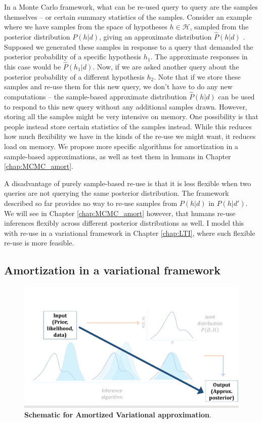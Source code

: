 In a Monte Carlo framework, what can be re-used query to query are the samples themselves -- or certain summary statistics of the samples. Consider an example where we have samples from the space of hypotheses $h \in \mathcal{H}$, sampled from the posterior distribution $P(h | d)$, giving an approximate distribution $\hat{P}(h | d)$ . Supposed we generated these samples in response to a query that demanded the posterior probability of a specific hypothesis $h_1$. The approximate responses in this case would be $\hat{P}(h_1 |d)$. Now, if we are asked another query about the posterior probability of a different hypothesis $h_2$. Note that if we store these samples and re-use them for this new query, we don't have to do any new computations -- the sample-based approximate distribution $\hat{P}(h | d)$ can be used to respond to this new query without any additional samples drawn. However, storing all the samples might be very intensive on memory. One possibility is that people instead store certain statistics of the samples instead. While this reduces how much flexibility we have in the kinds of the re-use we might want, it reduces load on memory. We propose more specific algorithms for amortization in a sample-based approximations, as well as test them in humans in Chapter \ref{chap:MCMC_amort}.

A disadvantage of purely sample-based re-use is that it is less flexible when two queries are not querying the same posterior distribution. The framework described so far provides no way to re-use samples from $P(h | d)$ in $P(h | d')$. We will see in Chapter \ref{chap:MCMC_amort} however, that humans re-use inferences flexibly across different posterior distributions as well. I model this with re-use in a variational framework in Chapter \ref{chap:LTI}, where such flexible re-use is more feasible.

\subsection{Amortization in a variational framework} 

\begin{figure}[t!]
\centering
\includegraphics[width = \textwidth]{figures/var_schematic_amort.pdf}
\caption{\textbf{Schematic for Amortized Variational approximation}. }
\label{fig:var_schematic_amort}
\end{figure}


